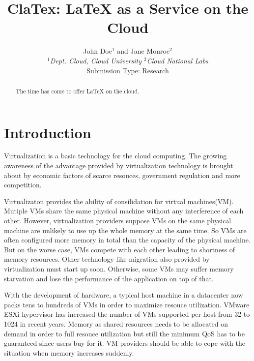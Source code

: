 \documentclass[10pt,twocolumn]{article}
\begin{document}
\title{ClaTex: LaTeX as a Service on the Cloud}
\author{John Doe$^1$ and Jane Monroe$^2$ \\
\small {\em  $^1$Dept. Cloud, Cloud University \quad
          $^2$Cloud National Labs} \\ [2mm]
\small Submission Type: Research
}
\date{}
\maketitle

\begin{abstract}
The time has come to offer LaTeX on the cloud.
\end{abstract}

\section{Introduction}
Virtualization is a basic technology for the cloud computing. The growing awareness of the advantage provided by virtualization technology is brought about by economic factors of scarce resouces, government regulation and more competition.

Virtualizaton provides the ability of consilidation for virtual machines(VM). Mutiple VMs share the same physical machine without any interference of each other. However, virtualization providers suppose VMs on the same physical machine are unlikely to use up the whole memory at the same time. So VMs are often configured more memory in total than the capacity of the physical machine. But on the worse case, VMs compete with each other leading to shortness of memory resources. Other technology like migration also provided by virtualization must start up soon. Otherwise, some VMs may suffer memory starvation and lose the performance of the application on top of that.

With the development of hardware, a typical host machine in a datacenter now packs tens to hundreds of VMs in order to maximize resouce utilization. VMware ESXi hypervisor has increased the number of VMs supported per host from 32 to 1024 in recent years\cite{vmware}. Memory as shared resources needs to be allocated on demand in order to full resouce utilization but still the minimum QoS has to be guaranteed since users buy for it. VM providers should be able to cope with the situation when memory increases suddenly.
\end{document}
